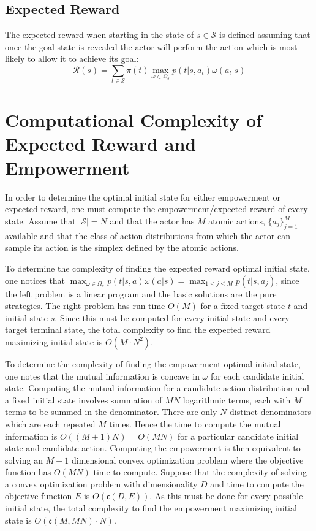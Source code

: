 \documentclass{article}
\newcommand{\Ss}{\mathcal{S}}
\newcommand{\Rr}{\mathcal{R}}
\begin{document}
\subsection{Expected Reward}
The expected reward when starting in the state of $s\in\mathcal{S}$ is defined assuming that once the goal state is revealed the actor will perform the action which is most likely to allow it to achieve its goal:
\[\Rr(s) = \sum_{t\in\Ss} \pi(t) \max_{\omega\in\Omega_s} p(t|s,a_t)\omega(a_t|s)\]
\section{Computational Complexity of Expected Reward and Empowerment}
In order to determine the optimal initial state for either empowerment or expected reward, one must compute the empowerment/expected reward of every state. Assume that $|\Ss|=N$ and that the actor has $M$ atomic actions, $\{a_j\}_{j=1}^M$ available and that the class of action distributions from which the actor can sample its action is the simplex defined by the atomic actions. 

To determine the complexity of finding the expected reward optimal initial state, one notices that $\max_{\omega\in\Omega_s} p(t|s,a)\omega(a|s) = \max_{1\leq j \leq M} p(t|s,a_j)$, since the left problem is a linear program and the basic solutions are the pure strategies. The right problem has run time $O(M)$ for a fixed target state $t$ and initial state $s$. Since this must be computed for every initial state and every target terminal state, the total complexity to find the expected reward maximizing initial state is $O(M\cdot N^2)$. 

To determine the complexity of finding the empowerment optimal initial state, one notes that the mutual information is concave \cite{braverman2011information} in $\omega$ for each candidate initial state. Computing the mutual information for a candidate action distribution and a fixed initial state involves summation of $MN$ logarithmic terms, each with $M$ terms to be summed in the denominator. There are only $N$ distinct denominators which are each repeated $M$ times. Hence the time to compute the mutual information is $O((M+1)N)=O(MN)$ for a particular candidate initial state and candidate action. Computing the empowerment is then equivalent to solving an $M-1$ dimensional convex optimization problem where the objective function has $O(MN)$ time to compute.  Suppose that the complexity of solving a convex optimization problem with dimensionality $D$ and time to compute the objective function $E$ is $O(\mathfrak{c}(D,E))$. As this must be done for every possible initial state, the total complexity to find the empowerment maximizing initial state is $O(\mathfrak{c}(M,MN)\cdot N)$. 
\end{document}
